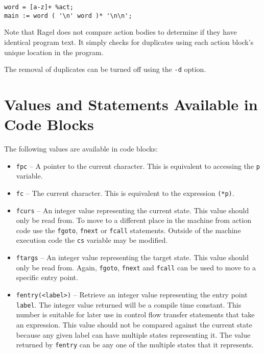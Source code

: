 \documentclass[letterpaper,11pt,oneside]{book}
\newcommand{\verbspace}{\vspace{10pt}}
\begin{document}
\verbspace
\begin{verbatim}
word = [a-z]+ %act;
main := word ( '\n' word )* '\n\n';
\end{verbatim}
\verbspace

Note that Ragel does not compare action bodies to determine if they have
identical program text. It simply checks for duplicates using each action
block's unique location in the program.

The removal of duplicates can be turned off using the \verb|-d| option.

\section{Values and Statements Available in Code Blocks}
\label{vals}

\noindent The following values are available in code blocks:

\begin{itemize}
\item \verb|fpc| -- A pointer to the current character. This is equivalent to
accessing the \verb|p| variable.

\item \verb|fc| -- The current character. This is equivalent to the expression \verb|(*p)|.

\item \verb|fcurs| -- An integer value representing the current state. This
value should only be read from. To move to a different place in the machine
from action code use the \verb|fgoto|, \verb|fnext| or \verb|fcall| statements.
Outside of the machine execution code the \verb|cs| variable may be modified.

\item \verb|ftargs| -- An integer value representing the target state. This
value should only be read from. Again, \verb|fgoto|, \verb|fnext| and
\verb|fcall| can be used to move to a specific entry point.

\item \verb|fentry(<label>)| -- Retrieve an integer value representing the
entry point \verb|label|. The integer value returned will be a compile time
constant. This number is suitable for later use in control flow transfer
statements that take an expression. This value should not be compared against
the current state because any given label can have multiple states representing
it. The value returned by \verb|fentry| can be any one of the multiple states that
it represents.
\end{itemize}
\end{document}
